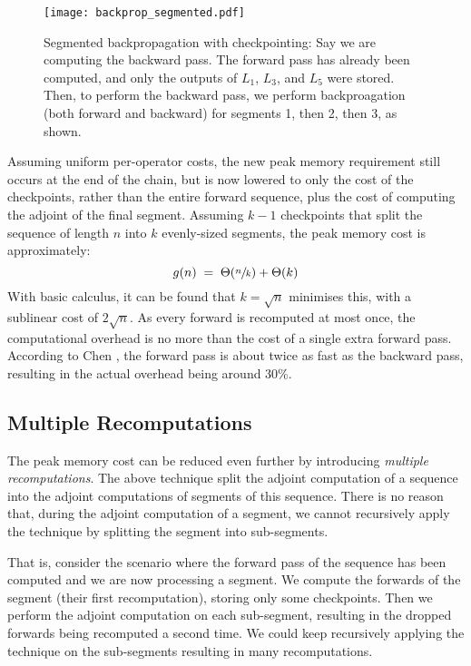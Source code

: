 \begin{figure}[h]
    \centering
    \texttt{[image: backprop\_segmented.pdf]}
    \caption{Segmented backpropagation with checkpointing: Say we are computing the backward pass. The forward pass has already been computed, and only the outputs of \(L_1\), \(L_3\), and \(L_5\) were stored. Then, to perform the backward pass, we perform backproagation (both forward and backward) for segments 1, then 2, then 3, as shown.}
    \label{fig:2-backprop-segmented}
\end{figure}

Assuming uniform per-operator costs, the new peak memory requirement still occurs at the end of the chain, but is now lowered to only the cost of the checkpoints, rather than the entire forward sequence, plus the cost of computing the adjoint of the final segment.
Assuming \(k-1\) checkpoints that split the sequence of length \(n\) into \(k\) evenly-sized segments, the peak memory cost is approximately:
\begin{equation*}
    g(n) \;=\; \Theta(\sfrac{n}{k}) + \Theta(k)
\end{equation*}
With basic calculus, it can be found that \(k = \sqrt{n}\) minimises this, with a sublinear cost of \(2\sqrt{n}\).
As every forward is recomputed at most once, the computational overhead is no more than the cost of a single extra forward pass.
According to Chen \cite{Chen2016}, the forward pass is about twice as fast as the backward pass, resulting in the actual overhead being around 30\%.

\subsection{Multiple Recomputations}
The peak memory cost can be reduced even further by introducing \textit{multiple recomputations}.
The above technique split the adjoint computation of a sequence into the adjoint computations of segments of this sequence.
There is no reason that, during the adjoint computation of a segment, we cannot recursively apply the technique by splitting the segment into sub-segments.

That is, consider the scenario where the forward pass of the sequence has been computed and we are now processing a segment.
We compute the forwards of the segment (their first recomputation), storing only some checkpoints. Then we perform the adjoint computation on each sub-segment, resulting in the dropped forwards being recomputed a second time. We could keep recursively applying the technique on the sub-segments resulting in many recomputations.

